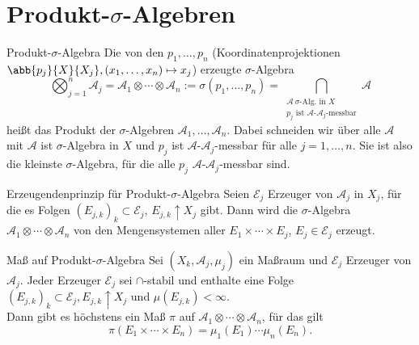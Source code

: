 \section*{Produkt-\(\sigma\)-Algebren}

\begin{karte}{Produkt-\(\sigma\)-Algebra}
    Die von den \( p_1, \ldots, p_n \) (Koordinatenprojektionen \(\abb{p_j}{X}{X_j}, (x_1,\ldots,x_n) \mapsto x_j\)) erzeugte 
    \( \sigma\)-Algebra 
    \[ \bigotimes_{j=1}^n \mathcal{A}_j 
    = \mathcal{A}_1 \otimes \cdots \otimes \mathcal{A}_n 
    := \sigma(p_1,\ldots, p_n) 
    = \bigcap_{\substack{\mathcal{A} \ \sigma\text{-Alg. in }X\\ p_j \text{ ist \(\mathcal{A}\)-\(\mathcal{A}_j\)-messbar} }} \mathcal{A} \]
    heißt das Produkt der \( \sigma \)-Algebren \( \mathcal{A}_1,\ldots, \mathcal{A}_n \). 
    Dabei schneiden wir über alle \( \mathcal{A} \) mit 
    \( \mathcal{A} \) ist \( \sigma \)-Algebra in \(X\) und \(p_j\) ist 
    \( \mathcal{A} \)-\( \mathcal{A}_j \)-messbar für alle \( j=1,\ldots, n \).
    Sie ist also die kleinste \( \sigma \)-Algebra, für die alle \( p_j  \)
    \( \mathcal{A} \)-\( \mathcal{A}_j \)-messbar sind.
\end{karte}

\begin{karte}{Erzeugendenprinzip für Produkt-\(\sigma\)-Algebra}
    Seien \( \mathcal{E}_j \) Erzeuger von \( \mathcal{A}_j \)
    in \(X_j\), für die es Folgen \( (E_{j,k})_k \subset \mathcal{E}_j \), 
    \( E_{j,k} \uparrow X_j \) gibt.
    Dann wird die \( \sigma \)-Algebra 
    \( \mathcal{A}_1 \otimes \cdots \otimes \mathcal{A}_n \) 
    von den Mengensystemen aller \( E_1 \times \cdots \times E_j \), 
    \( E_j \in \mathcal{E}_j \) erzeugt.
\end{karte}

\begin{karte}{Maß auf Produkt-\(\sigma\)-Algebra}
    Sei \( (X_k, \mathcal{A}_j, \mu_j) \) ein Maßraum und 
    \( \mathcal{E}_j \) Erzeuger von \( \mathcal{A}_j \). 
    Jeder Erzeuger \( \mathcal{E}_j \) sei \(\cap\)-stabil 
    und enthalte eine Folge \( (E_{j,k})_k \subset \mathcal{E}_j, 
    E_{j,k} \uparrow X_j \) und \( \mu(E_{j,k}) < \infty \).\\
    Dann gibt es höchstens ein Maß \(\pi\) auf 
    \( \mathcal{A}_1 \otimes \cdots \otimes \mathcal{A}_n \), 
    für das gilt 
    \[ \pi(E_1 \times \cdots \times E_n) 
    = \mu_1(E_1) \cdots \mu_n(E_n). \]
\end{karte}